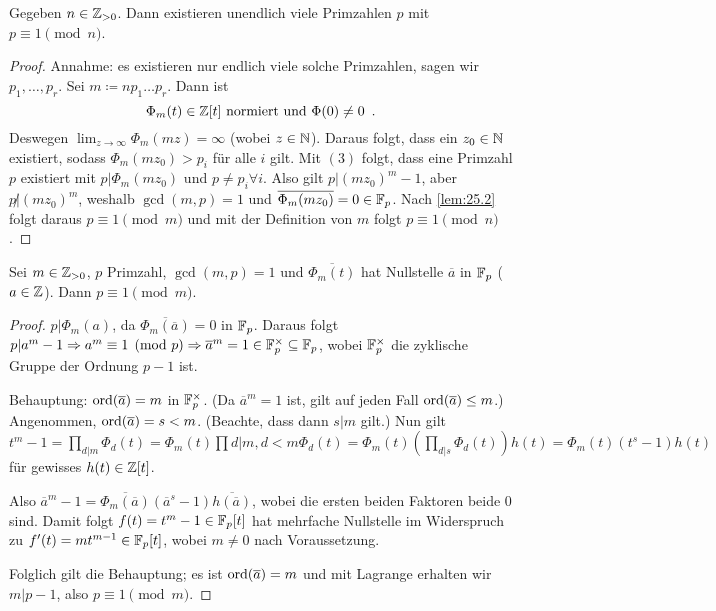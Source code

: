 \documentclass[12pt,a4paper]{scrartcl}
\begin{document}
\begin{satz}[Dirichlet]
	Gegeben $n\in\mathbb Z_{>0}$. Dann existieren unendlich viele Primzahlen $p$ mit $p\equiv 1\pmod n$.
\end{satz}
\begin{proof}
	Annahme: es existieren nur endlich viele solche Primzahlen, sagen wir $p_1,\dots,p_r$. Sei $m\coloneqq np_1\dots p_r$. Dann ist \begin{equation}\Phi_m(t) \in \mathbb Z[t]\text{ normiert und }\Phi(0)\neq 0\enspace .
	\end{equation}
	Deswegen $\lim_{z\to\infty}\Phi_m(mz) = \infty$ (wobei $z\in\mathbb N$). Daraus folgt, dass ein $z_0\in\mathbb N$ existiert, sodass $\Phi_m(mz_0)>p_i$ für alle $i$ gilt. Mit $(3)$ folgt, dass eine Primzahl $p$ existiert mit $p|\Phi_m(mz_0)$ und $p\neq p_i\forall i$. Also gilt $p|(mz_0)^m-1$, aber $p\not|(mz_0)^m$, weshalb $\gcd(m,p) = 1$ und $\overline{\Phi_m(mz_0)} = 0\in\mathbb F_p$. Nach \ref{lem:25.2} folgt daraus $p\equiv 1\pmod m$ und mit der Definition von $m$ folgt $p\equiv 1\pmod n$.
\end{proof}
\begin{lem}\label{lem:25.2}
	Sei $m\in\mathbb Z_{>0}$, $p$ Primzahl, $\gcd(m,p) = 1$ und $\overline{\Phi_m(t)}$ hat Nullstelle $\overline{a}$ in $\mathbb F_p$ ($a\in\mathbb Z$). Dann $p\equiv 1\pmod m$.
\end{lem}
\begin{proof}
	$p|\Phi_m(a)$, da $\overline{\Phi_m(\overline{a})} = 0$ in $\mathbb F_p$. Daraus folgt $p|a^m-1\Rightarrow a^m\equiv 1\pmod p\Rightarrow \overline{a}^m = 1\in\mathbb F_p^{\times}\subseteq \mathbb F_p$, wobei $\mathbb F_p^{\times}$ die zyklische Gruppe der Ordnung $p-1$ ist.
	
	Behauptung: $\operatorname{ord}(\overline{a}) = m$ in $\mathbb F_p^{\times}$. (Da $\overline{a}^m = 1$ ist, gilt auf jeden Fall $\operatorname{ord}(\overline{a})\leq m$.) Angenommen, $\operatorname{ord}(\overline{a}) = s<m$. (Beachte, dass dann $s|m$ gilt.) Nun gilt $t^m-1 = \prod_{d|m}\Phi_d(t) = \Phi_m(t)\prod{d|m, d<m}\Phi_d(t) = \Phi_m(t) \left(\prod_{d|s}\Phi_d(t)\right) h(t) = \Phi_m(t)(t^s-1)h(t)$ für gewisses $h(t)\in\mathbb Z[t]$.
		
	Also $\overline{a}^m-1 = \overline{\Phi_m(\overline{a})}(\overline{a}^s-1)\overline{h(\overline{a})}$, wobei die ersten beiden Faktoren beide $0$ sind. Damit folgt $f(t) = t^m-1\in\mathbb F_p[t]$ hat mehrfache Nullstelle im Widerspruch zu $f'(t) = mt^{m-1}\in\mathbb F_p[t]$, wobei $m\neq 0$ nach Voraussetzung.
	
	Folglich gilt die Behauptung; es ist $\operatorname{ord}(\overline{a}) = m$ und mit Lagrange erhalten wir $m|p-1$, also $p\equiv 1\pmod m$.
\end{proof}
\end{document}
